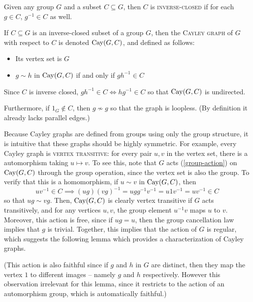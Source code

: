 \documentclass{report}
\begin{document}
    \begin{defn}\label{cayley-graph}
      Given any group $G$ and a subset $C \subseteq G$,
      then $C$ is \textsc{inverse-closed} if for each $g \in C$,
      $g^{-1} \in C$ as well.

      If $C \subseteq G$ is an inverse-closed subset of a group $G$,
      then the \textsc{Cayley graph} of $G$ with respect to $C$ is denoted
      $\operatorname{Cay}(G, C)$, and defined as follows:
      \begin{itemize}
        \item Its vertex set is $G$
        \item $g \sim h$ in $\operatorname{Cay}(G, C)$ if and only if $gh^{-1} \in C$
      \end{itemize}

      Since $C$ is inverse closed, $gh^{-1} \in C \iff hg^{-1} \in C$
      so that $\operatorname{Cay}(G, C)$ is undirected.

      Furthermore, if $1_G \not\in C$, then $g \not\sim g$ so that the graph is
      loopless.  (By definition it already lacks parallel edges.)
    \end{defn}

    Because Cayley graphs are defined from groups using only the group
    structure, it is intuitive that these graphs should be highly symmetric.
    For example, every Cayley graph is \textsc{vertex transitive}: for every
    pair $u, v$ in the vertex set, there is a automorphism taking $u \mapsto v$.
    To see this, note that $G$ acts (\ref{group-action}) on $\operatorname{Cay}(G, C)$ through
    the group operation, since the vertex set is also the group.
    To verify that this is a homomorphism, if $u \sim v$ in $\operatorname{Cay}(G, C)$, then
    $$
      uv^{-1} \in C
      \implies (ug)(vg)^{-1} = ugg^{-1}v^{-1} = u 1 v^{-1} = u v^{-1} \in C
    $$
    so that $ug \sim vg$.
    Then, $\operatorname{Cay}(G, C)$ is clearly vertex transitive if $G$ acts transitively,
    and for any vertices $u, v$, the group element $u^{-1} v$ maps $u$ to $v$.
    Moreover, this action is free, since if $ug = u$, then the group
    cancellation law implies that $g$ is trivial.
    Together, this implies that the action of $G$ is regular,
    which suggests the following lemma which provides a characterization of
    Cayley graphs.

    (This action is also faithful since if $g$ and $h$ in $G$ are distinct, then
    they map the vertex $1$ to different images -- namely $g$ and $h$
    respectively.  However this observation irrelevant for this lemma, since it
    restricts to the action of an automorphism group, which is automatically
    faithful.)
\end{document}
